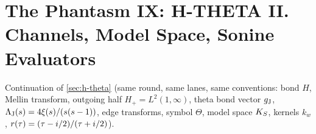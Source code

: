 
\section{The Phantasm IX: H-THETA II. Channels, Model Space, Sonine Evaluators}
\label{sec:h-theta-channels}

Continuation of \cref{sec:h-theta} (same round, same lanes, same conventions: bond $H$, Mellin transform, outgoing half
$H_+ = L^2(1,\infty)$, theta bond vector $g_{\mathrm J}$, $\Lambda_{\mathrm J}(s) = 4\xi(s)/(s(s-1))$, edge transforms, symbol $\Theta$, model
space $K_S$, kernels $k_w$, $r(\tau) = (\tau-i/2)/(\tau+i/2)$).

